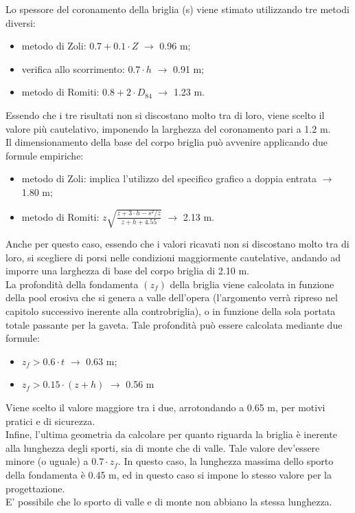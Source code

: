 Lo spessore del coronamento della briglia (s) viene stimato utilizzando tre metodi diversi:
\begin{itemize}
    \item metodo di Zoli: $0.7 + 0.1 \cdot Z$ $\rightarrow$ 0.96 m;
    \item verifica allo scorrimento: $0.7 \cdot h$ $\rightarrow$ 0.91 m;
    \item metodo di Romiti: $0.8 + 2 \cdot D_{84}$ $\rightarrow$ 1.23 m.
\end{itemize}
Essendo che i tre risultati non si discostano molto tra di loro, viene scelto il valore più cautelativo, imponendo la larghezza del coronamento pari a 1.2 m.\\
Il dimensionamento della base del corpo briglia può avvenire applicando due formule empiriche:
\begin{itemize}
    \item metodo di Zoli: implica l'utilizzo del specifico grafico a doppia entrata $\rightarrow$ 1.80 m;
    \item metodo di Romiti: $z \sqrt{\frac{z+3 \cdot h-s^2/z}{z+h+4.55}}$ $\rightarrow$ 2.13 m.
\end{itemize}
Anche per questo caso, essendo che i valori ricavati non si discostano molto tra di loro, si scegliere di porsi nelle condizioni maggiormente cautelative, andando ad imporre una larghezza di base del corpo briglia di 2.10 m.\\
La profondità della fondamenta $(z_f)$ della briglia viene calcolata in funzione della pool erosiva che si genera a valle dell'opera (l'argomento verrà ripreso nel capitolo successivo inerente alla controbriglia), o in funzione della sola portata totale passante per la gaveta. Tale profondità può essere calcolata mediante due formule:
\begin{itemize}
    \item $z_f > 0.6 \cdot t$ $\rightarrow$ 0.63 m;
    \item $z_f > 0.15 \cdot (z+h)$ $\rightarrow$ 0.56 m
\end{itemize}
Viene scelto il valore maggiore tra i due, arrotondando a 0.65 m, per motivi pratici e di sicurezza.\\
Infine, l'ultima geometria da calcolare per quanto riguarda la briglia è inerente alla lunghezza degli sporti, sia di monte che di valle. Tale valore dev'essere minore (o uguale) a $0.7 \cdot z_f$. In questo caso, la lunghezza massima dello sporto della fondamenta è 0.45 m, ed in questo caso si impone lo stesso valore per la progettazione.\\
E' possibile che lo sporto di valle e di monte non abbiano la stessa lunghezza. 